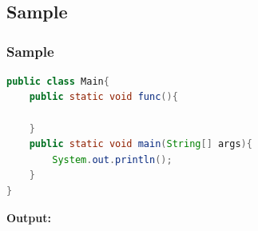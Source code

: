 \documentclass[12pt , a4paper]{article}
\begin{document}
%
%

%
%
\section{}
	\subsection{Sample}

	\subsubsection{Sample}

	\begin{problemDefBox}

	\end{problemDefBox} 

	\begin{lstlisting}[language=Java]
public class Main{
	public static void func(){

	}
	public static void main(String[] args){	
		System.out.println();		
	}
}		
	\end{lstlisting}

	\begin{tcolorbox}
	\textbf{Output:}\\

	\end{tcolorbox}
\end{document}
